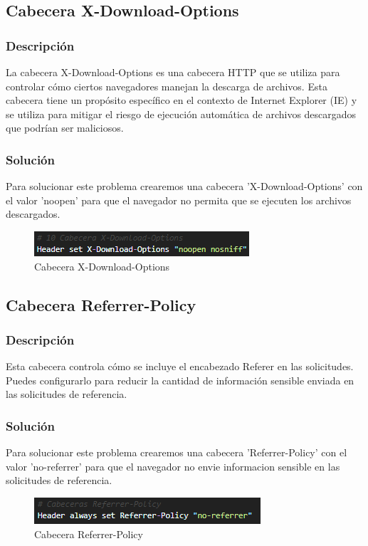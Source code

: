 \documentclass{report}
\begin{document}
            \subsection{Cabecera X-Download-Options}
                \subsubsection{Descripción}
                    La cabecera X-Download-Options es una cabecera HTTP que se utiliza para controlar cómo ciertos navegadores manejan la descarga de archivos. Esta cabecera tiene un propósito específico en el contexto de Internet Explorer (IE) y se utiliza para mitigar el riesgo de ejecución automática de archivos descargados que podrían ser maliciosos.
                \subsubsection{Solución}
                    Para solucionar este problema crearemos una cabecera 'X-Download-Options' con el valor 'noopen' para que el navegador no permita que se ejecuten los archivos descargados.
                    \begin{figure}[H]
                        \centering
                        \includegraphics[width=\textwidth]{./img/vulnerabilidades/3.5/10.1.png}
                        \caption{Cabecera X-Download-Options}
                    \end{figure}
            \clearpage
            \subsection{Cabecera Referrer-Policy}
                \subsubsection{Descripción}
                    Esta cabecera controla cómo se incluye el encabezado Referer en las solicitudes. Puedes configurarlo para reducir la cantidad de información sensible enviada en las solicitudes de referencia.
                \subsubsection{Solución}
                    Para solucionar este problema crearemos una cabecera 'Referrer-Policy' con el valor 'no-referrer' para que el navegador no envie informacion sensible en las solicitudes de referencia.
                    \begin{figure}[H]
                        \centering
                        \includegraphics[width=\textwidth]{./img/vulnerabilidades/3.5/11.1.png}
                        \caption{Cabecera Referrer-Policy}
                    \end{figure}
            \clearpage
\end{document}
